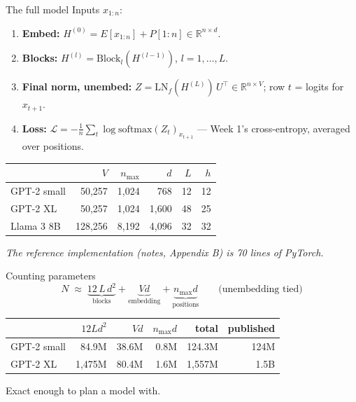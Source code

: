 \documentclass[11pt,aspectratio=169]{beamer}
\newcommand{\R}{\mathbb{R}}
\newcommand{\Lc}{\mathcal{L}}
\newcommand{\sm}{\mathrm{softmax}}
\newcommand{\LN}{\mathrm{LN}}
\newcommand{\T}{^{\top}}
\newcommand{\hook}[1]{{\small\textcolor{gray!60!black}{\textit{#1}}}}
\begin{document}
\begin{frame}{The full model}
  Inputs $x_{1:n}$:
  \begin{enumerate}
    \item \textbf{Embed:} $H^{(0)} = E[x_{1:n}] + P[1{:}n]\in\R^{n\times d}$.
    \item \textbf{Blocks:} $H^{(l)} = \mathrm{Block}_l(H^{(l-1)})$, $l = 1,\dots,L$.
    \item \textbf{Final norm, unembed:} $Z = \LN_f(H^{(L)})\,U\T\in\R^{n\times V}$;
          row $t$ = logits for $x_{t+1}$.
    \item \textbf{Loss:} $\Lc = -\frac1n\sum_t\log\sm(Z_t)_{x_{t+1}}$ --- Week 1's
          cross-entropy, averaged over positions.
  \end{enumerate}

  \vspace{0.6em}
  \begin{center}
  \begin{tabular}{@{}lrrrrr@{}}
    \toprule
    & $V$ & $n_{\max}$ & $d$ & $L$ & $h$ \\
    \midrule
    GPT-2 small & 50{,}257 & 1{,}024 & 768 & 12 & 12 \\
    GPT-2 XL & 50{,}257 & 1{,}024 & 1{,}600 & 48 & 25 \\
    Llama 3 8B & 128{,}256 & 8{,}192 & 4{,}096 & 32 & 32 \\
    \bottomrule
  \end{tabular}
  \end{center}
  \hook{The reference implementation (notes, Appendix B) is 70 lines of PyTorch.}
\end{frame}

\begin{frame}{Counting parameters}
  \[
    N \;\approx\; \underbrace{12\,L\,d^2}_{\text{blocks}} + \underbrace{Vd}_{\text{embedding}}
    + \underbrace{n_{\max}d}_{\text{positions}}\qquad\text{(unembedding tied)}
  \]

  \vspace{0.6em}
  \begin{center}
  \begin{tabular}{@{}lrrrrr@{}}
    \toprule
    & $12Ld^2$ & $Vd$ & $n_{\max}d$ & total & published \\
    \midrule
    GPT-2 small & 84.9M & 38.6M & 0.8M & 124.3M & 124M \\
    GPT-2 XL & 1{,}475M & 80.4M & 1.6M & 1{,}557M & 1.5B \\
    \bottomrule
  \end{tabular}
  \end{center}

  \vspace{0.8em}
  Exact enough to plan a model with.
\end{frame}
\end{document}
